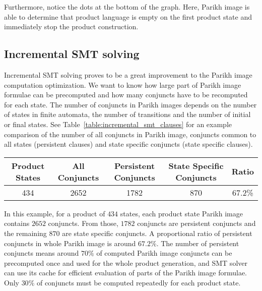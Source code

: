 Furthermore, notice the dots at the bottom of the graph. Here, Parikh image is able to determine that product language is empty on the first product state and immediately stop the product construction.

\subsection{Incremental SMT solving}

Incremental SMT solving proves to be a great improvement to the Parikh image computation optimization. We want to know how large part of Parikh image formulae can be precomputed and how many conjuncts have to be recomputed for each state. The number of conjuncts in Parikh images depends on the number of states in finite automata, the number of transitions and the number of initial or final states. See Table~\ref{table:incremental_smt_clauses} for an example comparison of the number of all conjuncts in Parikh image, conjuncts common to all states (persistent clauses) and state specific conjuncts (state specific clauses).

\begin{table*}[ht]
	\centering
	\small
    \begin{tabular}{ |c|c|c|c|c| }
        \hline
        Product States & All Conjuncts & Persistent Conjuncts & State Specific Conjuncts & Ratio \\ \hline
        434 & 2652 & 1782 & 870 & 67.2\% \\ \hline
    \end{tabular}
    \caption{An example proportion of persistent and state specific conjuncts in Parikh image computation with incremental SMT solving optimization. \emph{Product States} column shows the number of product states in the whole intersection product, \emph{All Conjuncts} column shows the number of conjuncts in each computed Parikh image, \emph{Persistent Conjuncts} column shows the number of persistent conjuncts in the whole Parikh image (out of the all Parikh image conjuncts), \emph{State Specific Conjuncts} column states how many Parikh image conjuncts have to be recomputed for each product state and \emph{Ratio} column shows the ratio of persistent conjuncts in all Parikh image conjuncts.}
    \label{table:incremental_smt_clauses}
\end{table*}

In this example, for a product of $434$ states, each product state Parikh image contains $2652$ conjuncts. From those, $1782$ conjuncts are persistent conjuncts and the remaining $870$ are state specific conjuncts. A proportional ratio of persistent conjuncts in whole Parikh image is around $67.2 \%$. The number of persistent conjuncts means around $70\%$ of computed Parikh image conjuncts can be precomputed once and used for the whole product generation, and SMT solver can use its cache for efficient evaluation of parts of the Parikh image formulae. Only $30\%$ of conjuncts must be computed repeatedly for each product state.

